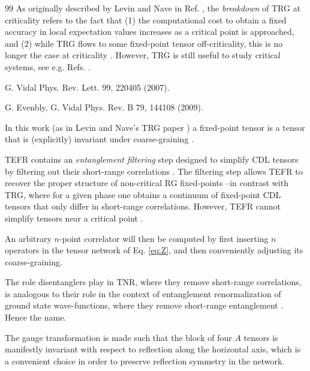 \documentclass[aps,prl,twocolumn,showpacs,superscriptaddress,floatfix,10pt]{revtex4-1}
\begin{document}
\begin{thebibliography}{99}
 As originally described by Levin and Nave in Ref. \cite{TRG}, the \textit{breakdown} of TRG at criticality refers to the fact that (1) the computational cost to obtain a fixed accuracy in local expectation values increases as a critical point is approached, and (2) while  TRG flows to some fixed-point tensor off-criticality, this is no longer the case at criticality \cite{TRG}. However, TRG is still useful to study critical systems, see e.g. Refs. \cite{TRG,TEFR,AppendixC}.

G. Vidal
Phys. Rev. Lett. 99, 220405 (2007).

G. Evenbly, G. Vidal
Phys. Rev. B 79, 144108 (2009).

 In this work (as in Levin and Nave's TRG paper \cite{TRG}) a fixed-point tensor is a tensor that is (explicitly) invariant under coarse-graining \cite{AppendixA}. 

 TEFR contains an \textit{entanglement filtering} step designed to simplify CDL tensors \cite{AppendixB} by filtering out their short-range correlations \cite{TEFR}. The filtering step allows TEFR to recover the proper structure of non-critical RG fixed-points --in contrast with TRG\cite{TRG}, where for a given phase one obtains a continuum of fixed-point CDL tensors that only differ in short-range correlations. However, TEFR cannot simplify tensors near a critical point \cite{privateXGW}.


 An arbitrary $n$-point correlator will then be computed by first inserting $n$ operators in the tensor network of Eq. \ref{eq:Z}, and then conveniently adjusting its coarse-graining.

 The role disentanglers play in TNR, where they remove short-range correlations, is analogous to their role in the context of entanglement renormalization of ground state wave-functions, where they remove short-range entanglement \cite{ER}. Hence the name.

 The gauge transformation is made such that the block of four $A$ tensors is manifestly invariant with respect to reflection along the horizontal axis, which is a convenient choice in order to preserve reflection symmetry in the network.


\end{thebibliography}
\end{document}
